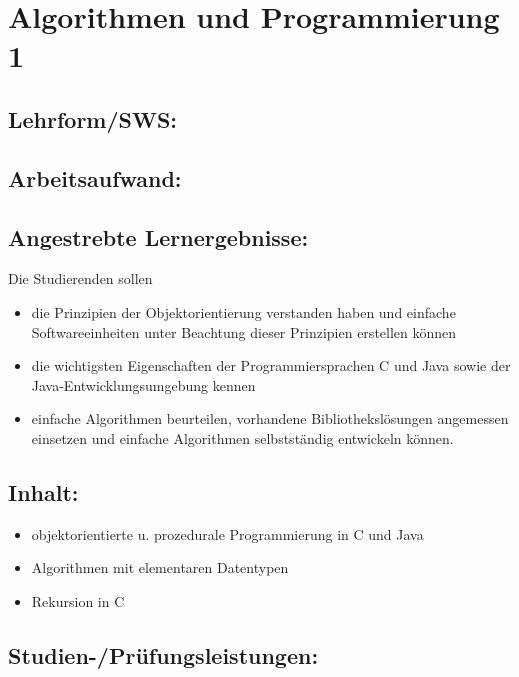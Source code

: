 \chapter{Algorithmen und Programmierung
1}\label{algorithmen-und-programmierung-1}

\section{Lehrform/SWS:}\label{lehrformsws}

\section{Arbeitsaufwand:}\label{arbeitsaufwand}

\section{Angestrebte
Lernergebnisse:}\label{angestrebte-lernergebnisse}

Die Studierenden sollen

\begin{itemize}
\tightlist
\item
  die Prinzipien der Objektorientierung verstanden haben und einfache
  Softwareeinheiten unter Beachtung dieser Prinzipien erstellen können
\item
  die wichtigsten Eigenschaften der Programmiersprachen C und Java sowie
  der Java-Entwicklungsumgebung kennen
\item
  einfache Algorithmen beurteilen, vorhandene Bibliothekslösungen
  angemessen einsetzen und einfache Algorithmen selbstständig entwickeln
  können.
\end{itemize}

\section{Inhalt:}\label{inhalt}

\begin{itemize}
\tightlist
\item
  objektorientierte u. prozedurale Programmierung in C und Java
\item
  Algorithmen mit elementaren Datentypen
\item
  Rekursion in C
\end{itemize}

\section{Studien-/Prüfungsleistungen:}\label{studien-pruxfcfungsleistungen}

